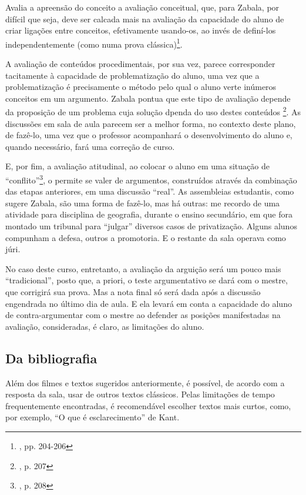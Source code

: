 \documentclass[12pt,a4paper]{article}
\begin{document}
	Avalia a apreensão do conceito a avaliação conceitual, que, para 
	Zabala, por difícil que seja, deve ser calcada mais na avaliação 
	da capacidade do aluno de criar ligações entre conceitos, efetivamente 
	usando-os, ao invés de definí-los independentemente (como numa prova 
	clássica)\footnote{\cite{zabala}, pp. 204-206}. 

	A avaliação de conteúdos procedimentais, por sua vez, parece 
	corresponder tacitamente à capacidade de problematização do aluno, 
	uma vez que a problematização é precisamente o método pelo qual o 
	aluno verte inúmeros conceitos em um argumento. Zabala pontua que 
	este tipo de avaliação depende da proposição de um problema cuja 
	solução dpenda do uso destes conteúdos
	\footnote{\cite{zabala}, p. 207}. As discussões em sala de aula 
	parecem ser a melhor forma, no contexto deste plano, de fazê-lo, uma 
	vez que o professor acompanhará o desenvolvimento do aluno e, quando 
	necessário, fará uma correção de curso. 

	E, por fim, a avaliação atitudinal, ao colocar o aluno em uma situação 
	de “conflito”\footnote{\cite{zabala}, p. 208}, o permite se valer de 
	argumentos, construídos através da combinação das etapas anteriores, 
	em uma discussão “real”. As assembleias estudantis, como sugere 
	Zabala, são uma forma de fazê-lo, mas há outras: me recordo de uma 
	atividade para disciplina de geografia, durante o ensino secundário, 
	em que fora montado um tribunal para “julgar” diversos casos de 
	privatização. Alguns alunos compunham a defesa, outros a promotoria. 
	E o restante da sala operava como júri. 

	No caso deste curso, entretanto, a avaliação da arguição será um 
	pouco mais “tradicional”, posto que, a priori, o teste argumentativo 
	se dará com o mestre, que corrigirá sua prova. Mas a nota final só 
	será dada após a discussão engendrada no último dia de aula. E ela 
	levará em conta a capacidade do aluno de contra-argumentar com o 
	mestre ao defender as posições manifestadas na avaliação, consideradas, 
	é claro, as limitações do aluno. 

	\subsection{Da bibliografia}

	Além dos filmes e textos sugeridos anteriormente, é possível, de 
	acordo com a resposta da sala, usar de outros textos clássicos. 
	Pelas limitações de tempo frequentemente encontradas, é recomendável 
	escolher textos mais curtos, como, por exemplo, “O que é 
	esclarecimento” de Kant. 
\end{document}
